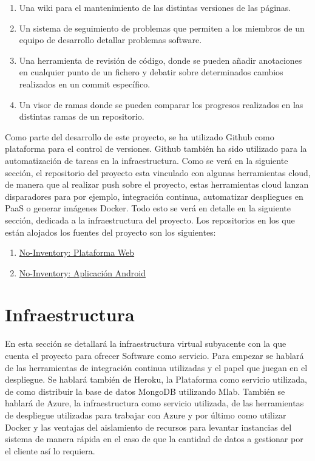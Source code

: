 \documentclass[a4paper,11pt]{book}
\begin{document}
\begin{enumerate}
\item Una wiki para el mantenimiento de las distintas versiones de las páginas. 
\item Un sistema de seguimiento de problemas que permiten a los miembros de un equipo de desarrollo detallar problemas software.
\item Una herramienta de revisión de código, donde se pueden añadir anotaciones en cualquier punto de un fichero y debatir sobre determinados cambios realizados en un commit específico. 
\item Un visor de ramas donde se pueden comparar los progresos realizados en las distintas ramas de un repositorio. 
\end{enumerate}

Como parte del desarrollo de este proyecto, se ha utilizado Github como plataforma para el control de versiones. Github también ha sido utilizado para la automatización de tareas en la infraestructura. Como se verá en la siguiente sección, el repositorio del proyecto esta vinculado con algunas herramientas cloud, de manera que al realizar push sobre el proyecto, estas herramientas cloud lanzan disparadores para por ejemplo, integración continua, automatizar despliegues en PaaS o generar imágenes Docker. Todo esto se verá en detalle en la siguiente sección, dedicada a la infraestructura del proyecto. Los repositorios en los que están alojados los fuentes del proyecto son los siguientes: 

\begin{enumerate}
\item  \href{https://github.com/hugobarzano/NoInventory}{No-Inventory: Plataforma Web}
\item  \href{https://github.com/hugobarzano/NoInventory-Android-Apps}{No-Inventory: Aplicación Android}

\end{enumerate}  


 
\section{Infraestructura}

En esta sección se detallará la infraestructura virtual subyacente con la que cuenta el proyecto para ofrecer Software como servicio. Para empezar se hablará de las herramientas de integración continua utilizadas y el papel que juegan en el despliegue. Se hablará también de Heroku, la Plataforma como servicio utilizada, de como distribuir la base de datos MongoDB utilizando Mlab. También se hablará de Azure, la infraestructura como servicio utilizada, de las herramientas de despliegue utilizadas para trabajar con Azure y por último como utilizar Docker y las ventajas del aislamiento de recursos para levantar instancias del sistema de manera rápida en el caso de que la cantidad de datos a gestionar por el cliente así lo requiera. 
\end{document}

